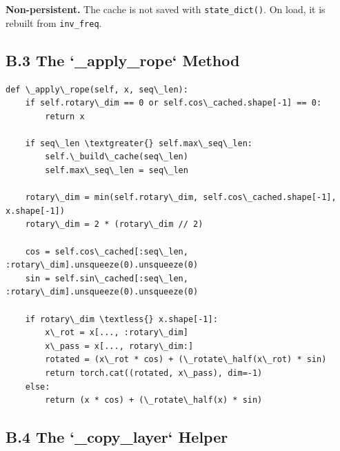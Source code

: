 \textbf{Non-persistent.} The cache is not saved with \texttt{state\_dict()}. On load, 
it is rebuilt from \texttt{inv\_freq}.

\subsection{B.3 The `\_apply\_rope` Method}

\begin{lstlisting}
def \_apply\_rope(self, x, seq\_len):
    if self.rotary\_dim == 0 or self.cos\_cached.shape[-1] == 0:
        return x
    
    if seq\_len \textgreater{} self.max\_seq\_len:
        self.\_build\_cache(seq\_len)
        self.max\_seq\_len = seq\_len
    
    rotary\_dim = min(self.rotary\_dim, self.cos\_cached.shape[-1], x.shape[-1])
    rotary\_dim = 2 * (rotary\_dim // 2)
    
    cos = self.cos\_cached[:seq\_len, :rotary\_dim].unsqueeze(0).unsqueeze(0)
    sin = self.sin\_cached[:seq\_len, :rotary\_dim].unsqueeze(0).unsqueeze(0)
    
    if rotary\_dim \textless{} x.shape[-1]:
        x\_rot = x[..., :rotary\_dim]
        x\_pass = x[..., rotary\_dim:]
        rotated = (x\_rot * cos) + (\_rotate\_half(x\_rot) * sin)
        return torch.cat((rotated, x\_pass), dim=-1)
    else:
        return (x * cos) + (\_rotate\_half(x) * sin)
\end{lstlisting}

\subsection{B.4 The `\_copy\_layer` Helper}


